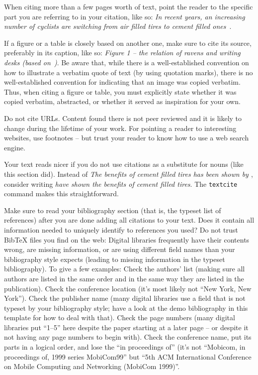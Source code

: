 \documentclass[]{nsm-thesis}
\begin{document}
When citing more than a few pages worth of text, point the reader to the specific part you are referring to in your citation, like so:
\emph{In recent years, an increasing number of cyclists are switching from air filled tires to cement filled ones~\cite[Table IV]{upper1974unsuccessful}}.

If a figure or a table is closely based on another one, make sure to cite its source, preferably in its caption, like so:
\emph{Figure 1 -- the relation of ravens and writing desks (based on~\cite[Figure~42]{sommer2011bidirectionally})}.
Be aware that, while there is a well-established convention on how to illustrate a verbatim quote of text (by using quotation marks), there is no well-established convention for indicating that an image was copied verbatim.
Thus, when citing a figure or table, you must explicitly state whether it was copied verbatim, abstracted, or whether it served as inspiration for your own.

Do not cite URLs. Content found there is not peer reviewed and it is likely to change during the lifetime of your work.
For pointing a reader to interesting websites, use footnotes -- but trust your reader to know how to use a web search engine.

Your text reads nicer if you do not use citations as a substitute for nouns (like this section did).
Instead of \emph{The benefits of cement filled tires has been shown by \cite{hardes2019communication}}, consider writing \emph{\textcite{knuth1984complexity} have shown the benefits of cement filled tires}.
The \texttt{textcite} command makes this straightforward.

Make sure to read your bibliography section (that is, the typeset list of references) after you are done adding all citations to your text.
Does it contain all information needed to uniquely identify to references you used?
Do not trust BibTeX files you find on the web:
Digital libraries frequently have their contents wrong, are missing information, or are using different field names than your bibliography style expects (leading to missing information in the typeset bibliography).
To give a few examples:
Check the authors' list (making sure all authors are listed in the same order and in the same way they are listed in the publication).
Check the conference location (it's most likely not \enquote{New York, New York}).
Check the publisher name (many digital libraries use a field that is not typeset by your bibliography style; have a look at the demo bibliography in this template for how to deal with that).
Check the page numbers (many digital libraries put \enquote{1--5} here despite the paper starting at a later page -- or despite it not having any page numbers to begin with).
Check the conference name, put its parts in a logical order, and lose the \enquote{in proceedings of} (it's not \enquote{Mobicom, in proceedings of, 1999 series MobiCom99} but \enquote{5th ACM International Conference on Mobile Computing and Networking (MobiCom 1999)}.
\end{document}
